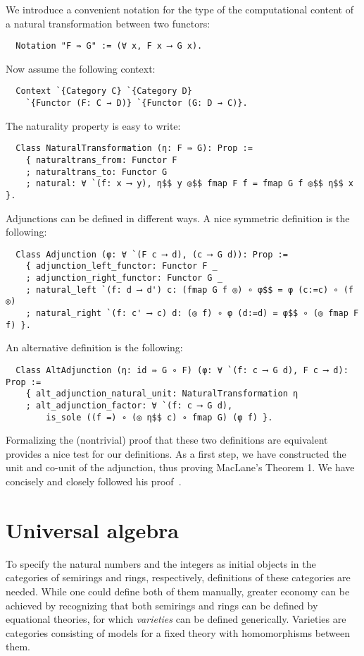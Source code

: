 \documentclass[a4paper,10pt,runningheads]{llncs}
\begin{document}
We introduce a convenient notation for the type of the computational content of a natural transformation between two functors:
\begin{lstlisting}
  Notation "F ⇛ G" := (∀ x, F x ⟶ G x).
\end{lstlisting}
Now assume the following context:
\begin{lstlisting}
  Context `{Category C} `{Category D}
    `{Functor (F: C → D)} `{Functor (G: D → C)}.
\end{lstlisting}
The naturality property is easy to write:
\begin{lstlisting}
  Class NaturalTransformation (η: F ⇛ G): Prop :=
    { naturaltrans_from: Functor F
    ; naturaltrans_to: Functor G
    ; natural: ∀ `(f: x ⟶ y), η$$ y ◎$$ fmap F f = fmap G f ◎$$ η$$ x }.
\end{lstlisting}

Adjunctions can be defined in different ways. A nice symmetric definition is the following:
\begin{lstlisting}
  Class Adjunction (φ: ∀ `(F c ⟶ d), (c ⟶ G d)): Prop :=
    { adjunction_left_functor: Functor F _
    ; adjunction_right_functor: Functor G _
    ; natural_left `(f: d ⟶ d') c: (fmap G f ◎) ∘ φ$$ = φ (c:=c) ∘ (f ◎)
    ; natural_right `(f: c' ⟶ c) d: (◎ f) ∘ φ (d:=d) = φ$$ ∘ (◎ fmap F f) }.
\end{lstlisting}
An alternative definition is the following:
\begin{lstlisting}
  Class AltAdjunction (η: id ⇛ G ∘ F) (φ: ∀ `(f: c ⟶ G d), F c ⟶ d): Prop :=
    { alt_adjunction_natural_unit: NaturalTransformation η
    ; alt_adjunction_factor: ∀ `(f: c ⟶ G d),
        is_sole ((f =) ∘ (◎ η$$ c) ∘ fmap G) (φ f) }.
\end{lstlisting}
Formalizing the (nontrivial) proof that these two definitions are equivalent provides a nice test for our definitions. As a first step, we have constructed the unit and co-unit of the adjunction, thus proving MacLane's Theorem 1. We have concisely and closely followed his proof~\cite{CatWork}. 

\section{Universal algebra}\label{univ}

To specify the natural numbers and the integers as initial objects in the categories of semirings and rings, respectively, definitions of these categories are needed. While one could define both of them manually, greater economy can be achieved by recognizing that both semirings and rings can be defined by equational theories, for which \emph{varieties} can be defined generically. Varieties are categories consisting of models for a fixed theory with homomorphisms between them.
\end{document}
